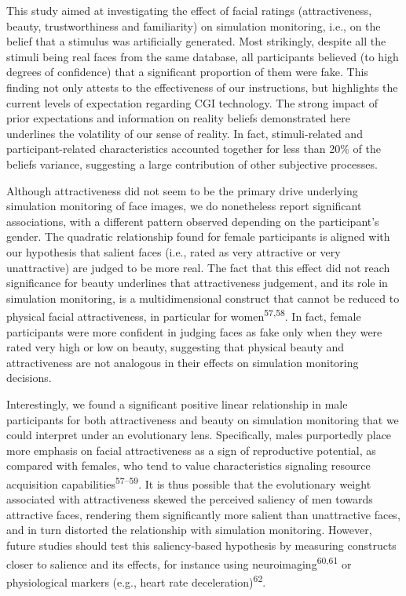 \documentclass[
  man,floatsintext]{apa6}
\begin{document}
This study aimed at investigating the effect of facial ratings (attractiveness, beauty, trustworthiness and familiarity) on simulation monitoring, i.e., on the belief that a stimulus was artificially generated. Most strikingly, despite all the stimuli being real faces from the same database, all participants believed (to high degrees of confidence) that a significant proportion of them were fake. This finding not only attests to the effectiveness of our instructions, but highlights the current levels of expectation regarding CGI technology. The strong impact of prior expectations and information on reality beliefs demonstrated here underlines the volatility of our sense of reality. In fact, stimuli-related and participant-related characteristics accounted together for less than 20\% of the beliefs variance, suggesting a large contribution of other subjective processes.

Although attractiveness did not seem to be the primary drive underlying simulation monitoring of face images, we do nonetheless report significant associations, with a different pattern observed depending on the participant's gender. The quadratic relationship found for female participants is aligned with our hypothesis that salient faces (i.e., rated as very attractive or very unattractive) are judged to be more real. The fact that this effect did not reach significance for beauty underlines that attractiveness judgement, and its role in simulation monitoring, is a multidimensional construct that cannot be reduced to physical facial attractiveness, in particular for women\textsuperscript{57,58}. In fact, female participants were more confident in judging faces as fake only when they were rated very high or low on beauty, suggesting that physical beauty and attractiveness are not analogous in their effects on simulation monitoring decisions.

Interestingly, we found a significant positive linear relationship in male participants for both attractiveness and beauty on simulation monitoring that we could interpret under an evolutionary lens. Specifically, males purportedly place more emphasis on facial attractiveness as a sign of reproductive potential, as compared with females, who tend to value characteristics signaling resource acquisition capabilities\textsuperscript{57--59}. It is thus possible that the evolutionary weight associated with attractiveness skewed the perceived saliency of men towards attractive faces, rendering them significantly more salient than unattractive faces, and in turn distorted the relationship with simulation monitoring. However, future studies should test this saliency-based hypothesis by measuring constructs closer to salience and its effects, for instance using neuroimaging\textsuperscript{60,61} or physiological markers
(e.g., heart rate deceleration)\textsuperscript{62}.
\end{document}
